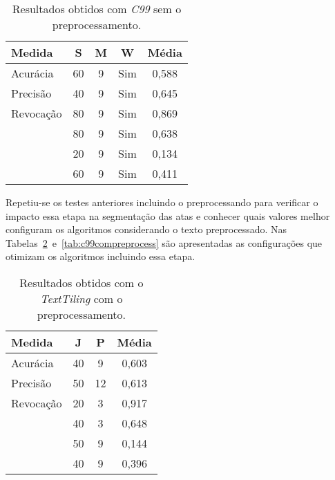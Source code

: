 \begin{table}[!h]
	\centering

	\begin{tabular}{|l|c|c|c|c|} \hline
		\textbf{Medida} & \textbf{S} & \textbf{M} & \textbf{W} & \textbf{Média}\\	\hline

		Acurácia	& 60 & 9 & Sim & 0,588 \\ \hline
		Precisão	& 40 & 9 & Sim & 0,645 \\ \hline
		Revocação	& 80 & 9 & Sim & 0,869 \\ \hline
		\fum		& 80 & 9 & Sim & 0,638 \\ \hline
		\pk			& 20 & 9 & Sim & 0,134 \\ \hline
		\windiff	& 60 & 9 & Sim & 0,411 \\ \hline
		
	\end{tabular}
	
	\caption{Resultados obtidos com \textit{C99} sem o preprocessamento.}
	\label{tab:c99sempreprocess}
\end{table}




Repetiu-se os testes anteriores incluindo o preprocessando para verificar o impacto essa etapa na segmentação das atas e conhecer quais valores melhor configuram os algoritmos considerando o texto preprocessado. 
%
Nas Tabelas~\ref{tab:texttilingcompreprocess}~e~\ref{tab:c99compreprocess} são apresentadas as configurações que otimizam os algoritmos incluindo essa etapa.




\begin{table}[!h]
	\centering
	\begin{tabular}{|l|c|c|c|} \hline
		\textbf{Medida} & \textbf{J} & \textbf{P} & \textbf{Média}\\		\hline

		Acurácia	& 40 & 9  & 0,603 \\ \hline	
		Precisão	& 50 & 12 & 0,613 \\ \hline			
		Revocação	& 20 & 3  & 0,917 \\ \hline		
		\fum		& 40 & 3  & 0,648 \\ \hline	
		\pk			& 50 & 9  & 0,144 \\ \hline	
		\windiff	& 40 & 9  & 0,396 \\ \hline		

	\end{tabular}
	\caption{Resultados obtidos com o \textit{TextTiling} com o preprocessamento.}
	\label{tab:texttilingcompreprocess}
\end{table}



